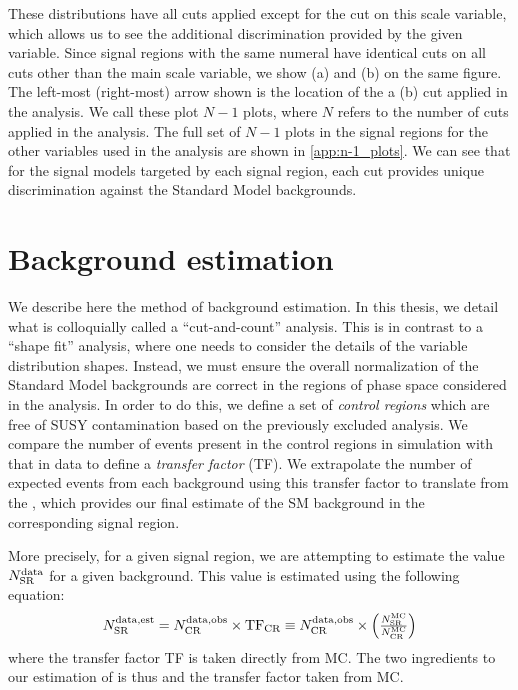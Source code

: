 These distributions have all cuts applied except for the cut on this scale variable, which allows us to see the additional discrimination provided by the given variable.
Since signal regions with the same numeral have identical cuts on all cuts other than the main scale variable, we show (a) and (b) on the same figure.
The left-most (right-most) arrow shown is the location of the a (b) cut applied in the analysis.
We call these plot \textit{$N-1$} plots, where $N$ refers to the number of cuts applied in the analysis.
The full set of $N-1$ plots in the signal regions for the other variables used in the analysis are shown in \ref{app:n-1_plots}.
We can see that for the signal models targeted by each signal region, each cut provides unique discrimination against the Standard Model backgrounds.



\section{Background estimation}

We describe here the method of background estimation.
In this thesis, we detail what is colloquially called a ``cut-and-count'' analysis.
This is in contrast to a ``shape fit'' analysis, where one needs to consider the details of the variable distribution shapes.
Instead, we must ensure the overall normalization of the Standard Model backgrounds are correct in the regions of phase space considered in the analysis.
In order to do this, we define a set of \textit{control regions} which are free of SUSY contamination based on the previously excluded analysis.
We compare the number of events present in the control regions in simulation with that in data to define a \textit{transfer factor} (TF).
We extrapolate the number of expected events from each background using this transfer factor to translate from the , which provides our final estimate of the SM background in the corresponding signal region.\footnotemark
{}

More precisely, for a given signal region, we are attempting to estimate the value $\ntext{SR}{data}$ for a given background.
This value is estimated using the following equation:
\begin{align}\label{eq:bkg_est}
\ntext{SR}{data,est} = \ntext{CR}{data,obs} \times \text{TF}_{\text{CR}} \equiv \ntext{CR}{data,obs} \times  \begin{pmatrix} \frac{ \ntext{SR}{MC} }{ \ntext{CR}{MC} } \end{pmatrix}
\end{align}
where the transfer factor TF is taken directly from MC.
The two ingredients to our estimation of  is thus  and the transfer factor taken from MC.

